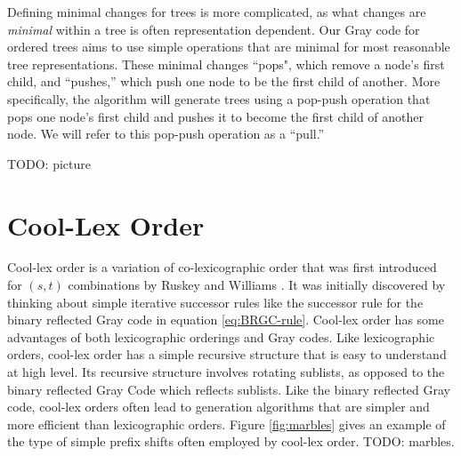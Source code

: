 



Defining minimal changes for trees is more complicated, as what changes are \emph{minimal} within a tree is often representation dependent.  Our Gray code for ordered trees aims to use simple operations that are minimal for most reasonable tree representations.  These minimal changes ``pops", which remove a node's first child, and ``pushes,'' which push one node to be the first child of another.  More specifically, the algorithm will generate trees using a pop-push operation that pops one node's first child and pushes it to become the first child of another node.  We will refer to this pop-push operation as a ``pull.''

TODO: picture

\section{Cool-Lex Order}

Cool-lex order is a variation of co-lexicographic order that was first introduced for $(s,t)$ combinations by Ruskey and Williams \cite{ruskey2005generating} \cite{ruskey2008generating}.  It was initially discovered by thinking about simple iterative successor rules like the successor rule for the binary reflected Gray code in equation \ref{eq:BRGC-rule}. Cool-lex order has some advantages of both lexicographic orderings and Gray codes.  Like lexicographic orders, cool-lex order has a simple recursive structure that is easy to understand at  high level.  Its recursive structure involves rotating sublists, as opposed to the binary reflected Gray Code which reflects sublists.  Like the binary reflected Gray code, cool-lex orders often lead to generation algorithms that are simpler and more efficient than lexicographic orders.   Figure \ref{fig:marbles} gives an example of the type of simple prefix shifts often employed by cool-lex order.
TODO: marbles.


